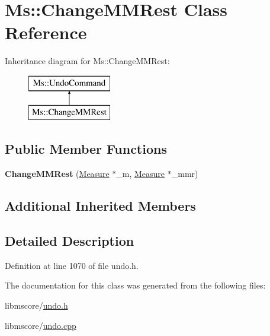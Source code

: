 \hypertarget{class_ms_1_1_change_m_m_rest}{}\section{Ms\+:\+:Change\+M\+M\+Rest Class Reference}
\label{class_ms_1_1_change_m_m_rest}
Inheritance diagram for Ms\+:\+:Change\+M\+M\+Rest\+:\begin{figure}[H]
\begin{center}
\leavevmode
\includegraphics[height=2.000000cm]{class_ms_1_1_change_m_m_rest}
\end{center}
\end{figure}
\subsection*{Public Member Functions}
\begin{DoxyCompactItemize}
\item 
\mbox{\label{class_ms_1_1_change_m_m_rest_aeab5453f77915c377854e6d363a940a7}} 
{\bfseries Change\+M\+M\+Rest} (\hyperlink{class_ms_1_1_measure}{Measure} $\ast$\+\_\+m, \hyperlink{class_ms_1_1_measure}{Measure} $\ast$\+\_\+mmr)
\end{DoxyCompactItemize}
\subsection*{Additional Inherited Members}


\subsection{Detailed Description}


Definition at line 1070 of file undo.\+h.



The documentation for this class was generated from the following files\+:\begin{DoxyCompactItemize}
\item 
libmscore/\hyperlink{undo_8h}{undo.\+h}\item 
libmscore/\hyperlink{undo_8cpp}{undo.\+cpp}\end{DoxyCompactItemize}
